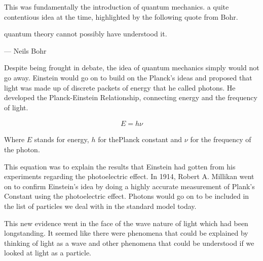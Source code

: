This was fundamentally the introduction of quantum mechanics.  a quite contentious idea at the time, highlighted by the following quote from Bohr.

quantum theory cannot possibly have understood it.

\begin{flushright}--- Neils Bohr\end{flushright}

Despite being frought in debate, the idea of quantum mechanics simply would not go away.
Einstein would go on to build on the Planck's ideas and proposed that light was made up of discrete packets of energy that he called photons.
He developed the Planck-Einstein Relationship, connecting  energy and the frequency of light.

\begin{align}
  E = h \nu
\end{align}

Where $E$ stands for energy, $h$ for thePlanck constant and $\nu$ for the frequency of the photon.


This equation was to explain the results that Einstein had gotten from his experiments regarding the photoelectric effect.
In 1914, Robert A. Millikan went on to confirm Einstein's idea by doing  a highly accurate measurement of Plank's Constant  using the photoelectric effect.
Photons would go on to be included in the list of particles we deal with in the standard model today.

This new evidence went in the face of the wave nature of light which had been longstanding.
It seemed like  there were phenomena that could be explained by thinking of light as a wave and other phenomena that could be understood if we looked at light as a particle.

